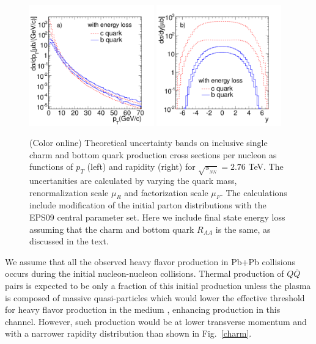 \begin{figure}
\includegraphics[width=0.48\textwidth]{chap_DiMuonContinuum_figures/Fig2a_histEloss_Pt}
\includegraphics[width=0.48\textwidth]{chap_DiMuonContinuum_figures/Fig2b_histEloss_Rap}
\caption{(Color online) Theoretical uncertainty bands on inclusive single 
charm and bottom quark production cross sections per nucleon as functions 
of $p_T$ (left) and rapidity (right) for $\sqrt{s_{_{NN}}} = 2.76$ TeV. 
The uncertanities are calculated by 
varying the quark mass, renormalization scale $\mu_{R}$
and factorization scale $\mu_{F}$. The calculations include 
modification of the initial parton distributions with the EPS09 central
parameter set.
Here we include final state energy loss assuming that the charm and bottom
quark $R_{AA}$ is the same, as discussed in the text.}
\label{QPtYUncertELoss}
\end{figure}

We assume that all the observed heavy flavor production in Pb+Pb collisions
occurs during the initial nucleon-nucleon collisions.  Thermal production of
$Q \overline Q$ pairs is expected to be only a fraction of this initial
production \cite{GAVIN} unless the plasma is composed of massive quasi-particles
which would lower the effective threshold for heavy flavor production in the
medium \cite{LEVAI}, enhancing production in this channel.  However, such
production would be at lower transverse momentum and with a narrower rapidity
distribution than shown in Fig.~\ref{charm}.

